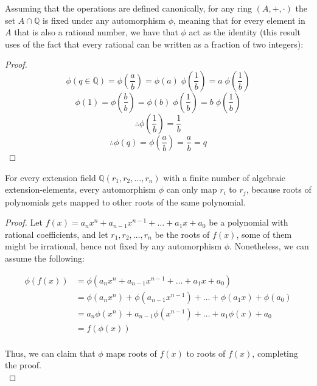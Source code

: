 \newpage

\begin{lemma}
\label{lem:fixedRationals}
Assuming that the operations are defined canonically, for any ring $(A, +, \cdot)$ the set $A \cap 
\mathbb{Q}$ is fixed under any automorphism $\phi$, meaning that 
for every element in $A$ that is also a rational number, we have that $\phi$ act as the identity (this result 
uses of the fact that every rational can be written as a fraction of two integers):
\end{lemma}
\begin{proof}
$$ \phi(q \in \mathbb{Q}) = \phi(\frac{a}{b}) = \phi(a)\;\phi(\frac{1}{b}) = a\;\phi(\frac{1}{b}) $$
$$ \phi(1) = \phi(\frac{b}{b}) = \phi(b)\;\phi(\frac{1}{b}) = b\;\phi(\frac{1}{b}) $$
$$ \therefore \phi(\frac{1}{b}) = \frac{1}{b} $$
$$ \therefore \phi(q) = \phi(\frac{a}{b}) = \frac{a}{b} = q $$
\end{proof}

\begin{theorem}
For every extension field $\mathbb{Q}(r_1, r_2, \dots, r_n)$ with a finite number of algebraic extension-elements, every automorphism $\phi$ 
can only map $r_i$ to $r_j$, because roots of polynomials gets mapped to other roots of the same polynomial.
\end{theorem}
\begin{proof}
    Let $f(x) = a_nx^n + a_{n-1}x^{n-1} + \dots + a_1x + a_0$ be a polynomial with rational coefficients, 
    and let $r_1, r_2, \dots, r_n$ be the roots of $f(x)$, some of them might be irrational, hence not 
    fixed by any automorphism $\phi$. Nonetheless, we can assume the following:
 
    \begin{align*}
        \phi(f(x)) 
        &= \phi(a_nx^n + a_{n-1}x^{n-1} + \dots + a_1x + a_0)                   \\
        &= \phi(a_nx^n) + \phi(a_{n-1}x^{n-1}) + \dots + \phi(a_1x) + \phi(a_0) \\
        &= a_n\phi(x^n) + a_{n-1}\phi(x^{n-1}) + \dots + a_1\phi(x) + a_0       \\
        &= f(\phi(x))                                                           \\
    \end{align*}

    Thus, we can claim that $\phi$ maps roots of $f(x)$ to roots of $f(x)$, completing the proof. \\
\end{proof}

